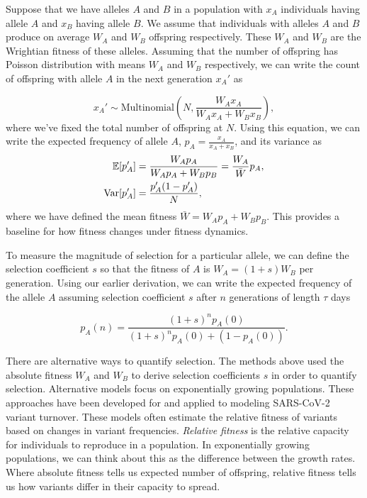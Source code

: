 Suppose that we have alleles $A$ and $B$ in a population with $x_A$ individuals having allele $A$ and $x_B$ having allele $B$.
We assume that individuals with alleles $A$ and $B$ produce on average $W_A$ and $W_B$ offspring respectively.
These $W_A$ and $W_B$ are the Wrightian fitness of these alleles.
Assuming that the number of offspring has Poisson distribution with means $W_A$ and $W_B$ respectively, we can write the count of offspring with allele $A$ in the next generation $x_A'$ as

\begin{equation}
x_A' \sim \text{Multinomial}\left(N, \frac{W_A x_A}{W_A x_A + W_B x_B}\right),
\end{equation}
where we've fixed the total number of offspring at $N$.
Using this equation, we can write the expected frequency of allele $A$, $p_A = \frac{x_A}{x_A + x_B}$, and its variance as
\begin{align}
  \mathbb{E}[p_A'] &= \frac{W_A p_A }{W_A p_A + W_B p_B} = \frac{W_A}{\bar{W}}p_A,\\
  \text{Var}[p_A'] &= \frac{p_A' (1 - p_A')}{N} \label{eq:allele_variance},
\end{align}
where we have defined the mean fitness $\bar{W} = W_A p_A + W_B p_B$.
This provides a baseline for how fitness changes under fitness dynamics.

To measure the magnitude of selection for a particular allele, we can define the selection coefficient $s$ so that the fitness of $A$ is $W_A = (1+s) W_B$ per generation.
Using our earlier derivation, we can write the expected frequency of the allele $A$ assuming selection coefficient $s$ after $n$ generations of length $\tau$ days

\begin{equation}
  p_A(n) = \frac{(1+s)^{n}p_{A}(0)}{(1+s)^{n}p_{A}(0) + (1 - p_{A}(0))}.
\end{equation}



There are alternative ways to quantify selection.
The methods above used the absolute fitness $W_A$ and $W_B$ to derive selection coefficients $s$ in order to quantify selection.
Alternative models focus on exponentially growing populations.
These approaches have been developed for and applied to modeling SARS-CoV-2 variant turnover.
These models often estimate the relative fitness of variants based on changes in variant frequencies.
\emph{Relative fitness} is the relative capacity for individuals to reproduce in a population.
In exponentially growing populations, we can think about this as the difference between the growth rates.
Where absolute fitness tells us expected number of offspring, relative fitness tells us how variants differ in their capacity to spread.

